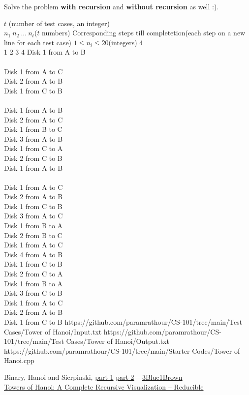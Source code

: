 Solve the problem \textbf{with recursion} and \textbf{without recursion} as well :).
\begin{testcasesMore}
	{$t$ \hfill(number of test cases, an integer)\\$n_1\ n_2\ \ldots \ n_t$\hfill($t$ numbers)}
	{Corresponding steps till completetion\hfill(each step on a new line for each test case)}
	{$1\leq n_i \leq 20$\hfill(integers)}
	{4\\1 2 3 4}
	{Disk 1 from A to B\\\\
	Disk 1 from A to C\\
	Disk 2 from A to B\\
	Disk 1 from C to B\\\\
	Disk 1 from A to B\\
	Disk 2 from A to C\\
	Disk 1 from B to C\\
	Disk 3 from A to B\\
	Disk 1 from C to A\\
	Disk 2 from C to B\\
	Disk 1 from A to B\\\\
	Disk 1 from A to C\\
	Disk 2 from A to B\\
	Disk 1 from C to B\\
	Disk 3 from A to C\\
	Disk 1 from B to A\\
	Disk 2 from B to C\\
	Disk 1 from A to C\\
	Disk 4 from A to B\\
	Disk 1 from C to B\\
	Disk 2 from C to A\\
	Disk 1 from B to A\\
	Disk 3 from C to B\\
	Disk 1 from A to C\\
	Disk 2 from A to B\\
	Disk 1 from C to B}
	{https://github.com/paramrathour/CS-101/tree/main/Test Cases/Tower of Hanoi/Input.txt}
	{https://github.com/paramrathour/CS-101/tree/main/Test Cases/Tower of Hanoi/Output.txt}
	{https://github.com/paramrathour/CS-101/tree/main/Starter Codes/Tower of Hanoi.cpp}
\end{testcasesMore}
\begin{funvideo}
	Binary, Hanoi and Sierpinski, \href{https://youtu.be/2SUvWfNJSsM}{part 1} \href{https://youtu.be/bdMfjfT0lKk}{part 2} -- \href{https://www.youtube.com/@3blue1brown}{3Blue1Brown}\\
	\href{https://youtu.be/rf6uf3jNjbo}{Towers of Hanoi: A Complete Recursive Visualization -- Reducible}
\end{funvideo}
\recalctypearea
{}
\recalctypearea
